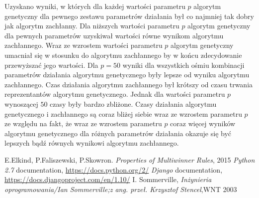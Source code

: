 \documentclass[polish,11pt]{aghthesis}
\begin{document}
\noindent Uzyskano wyniki, w których dla każdej wartości parametru $p$ algorytm genetyczny dla pewnego zestawu parametrów działania był co najmniej tak dobry jak algorytm zachłanny. Dla niższych wartości parametru $p$ algorytm genetyczny dla pewnych parametrów uzyskiwał wartości równe wynikom algorytmu zachłannego. Wraz ze wzrostem wartości parametru $p$ algorytm genetyczny umacniał się w stosunku do algorytmu zachłannego by w końcu zdecydowanie przewyższać jego wartości. Dla $p=50$ wyniki dla wszystkich ośmiu kombinacji parametrów działania algorytmu genetycznego były lepsze od wyniku algorytmu zachłannego. Czas działania algorytmu zachłannego był krótszy od czasu trwania reprezentantów algorytmu genetycznego. Jednak dla wartości parametru $p$ wynoszącej $50$ czasy były bardzo zbliżone. Czasy działania algorytmu genetycznego i zachłannego są coraz bliżej siebie wraz ze wzrostem parametru $p$ ze względu na fakt, że wraz ze wzrostem parametru $p$ coraz więcej wyników algorytmu genetycznego dla różnych parametrów działania okazuje się być lepszych bądź równych wynikowi algorytmu zachłannego.    
\newpage

\newpage
\cleardoublepage
{}
\listoffigures




%
\begin{thebibliography}{99}
\bibitem{}
E.Elkind, P.Faliszewski, P.Skowron. \textit{Properties of Multiwinner Rules}, 2015
\bibitem{}
\textit{Python 2.7} documentation, \url{https://docs.python.org/2/} 
\bibitem{}
\textit{Django} documentation, \url{https://docs.djangoproject.com/en/1.10/}
\bibitem{}
I. Sommerville, \textit{Inżynieria oprogramowania/Ian Sommerville;z ang. przeł. Krzysztof Stencel},WNT 2003

\end{thebibliography}
\end{document}
